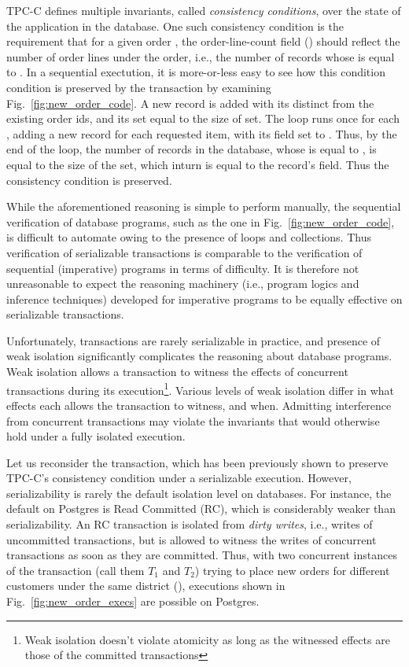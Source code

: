 TPC-C defines multiple invariants, called \emph{consistency
conditions}, over the state of the application in the database. One
such consistency condition is the requirement that for a given order
, the order-line-count field () should reflect
the number of order lines under the order, i.e., the number of
 records whose  is equal to .
In a sequential exectution, it is more-or-less easy to see how this
condition condition is preserved by the  transaction by
examining Fig.~\ref{fig:new_order_code}. A new  record is
added with its  distinct from the existing order ids, and its
 set equal to the size of  set. The
 loop runs once for each , adding a new
 record for each requested item, with its 
field set to . Thus, by the end of the loop, the number of
 records in the database, whose  is equal
to , is equal to the size of the  set, which
inturn is equal to the  record's  field. Thus
the consistency condition is preserved. 

While the aforementioned reasoning is simple to perform manually, the
sequential verification of database programs, such as the one in
Fig.~\ref{fig:new_order_code}, is difficult to automate owing to the
presence of loops and collections. Thus verification of serializable
transactions is comparable to the verification of sequential
(imperative) programs in terms of difficulty. It is therefore not
unreasonable to expect the reasoning machinery (i.e., program logics
and inference techniques) developed for imperative programs to be
equally effective on serializable transactions.

Unfortunately, transactions are rarely serializable in practice, and
presence of weak isolation significantly complicates the reasoning
about database programs. Weak isolation allows a transaction to
witness the effects of concurrent transactions during its
execution\footnote{Weak isolation doesn't violate atomicity as long as
the witnessed effects are those of the committed transactions}.
Various levels of weak isolation differ in what effects each allows
the transaction to witness, and when. Admitting interference from
concurrent transactions may violate the invariants that would
otherwise hold under a fully isolated execution. 

Let us reconsider the  transaction, which has been
previously shown to preserve TPC-C's consistency condition under a
serializable execution. However, serializability is rarely the default
isolation level on databases. For instance, the default on Postgres is
Read Committed (RC), which is considerably weaker than
serializability. An RC transaction is isolated from \emph{dirty
writes}, i.e., writes of uncommitted transactions, but is allowed to
witness the writes of concurrent transactions as soon as they are
committed. Thus, with two concurrent instances of the 
transaction (call them $T_1$ and $T_2$) trying to place new orders for
different customers under the same district (), executions
shown in Fig.~\ref{fig:new_order_execs} are possible on Postgres.

